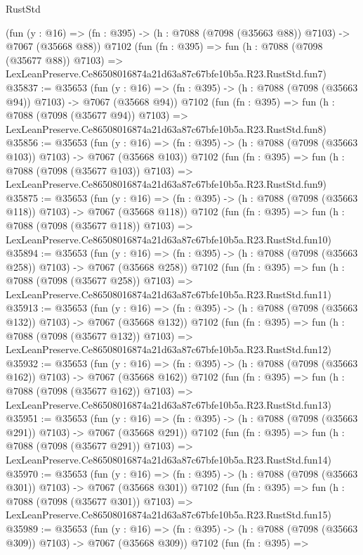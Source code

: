 \begin{lexlean}{RustStd}
\begin{coremodule}
    (fun (y : @16) => (fn : @395) -> (h : @7088 (@7098 (@35663 @88)) @7103) -> @7067 (@35668 @88))
    @7102
    (fun (fn : @395) =>
    fun (h : @7088 (@7098 (@35677 @88)) @7103) =>
    LexLeanPreserve.Ce86508016874a21d63a87c67bfe10b5a.R23.RustStd.fun7)
@35837 := @35653
    (fun (y : @16) => (fn : @395) -> (h : @7088 (@7098 (@35663 @94)) @7103) -> @7067 (@35668 @94))
    @7102
    (fun (fn : @395) =>
    fun (h : @7088 (@7098 (@35677 @94)) @7103) =>
    LexLeanPreserve.Ce86508016874a21d63a87c67bfe10b5a.R23.RustStd.fun8)
@35856 := @35653
    (fun (y : @16) => (fn : @395) -> (h : @7088 (@7098 (@35663 @103)) @7103) -> @7067 (@35668 @103))
    @7102
    (fun (fn : @395) =>
    fun (h : @7088 (@7098 (@35677 @103)) @7103) =>
    LexLeanPreserve.Ce86508016874a21d63a87c67bfe10b5a.R23.RustStd.fun9)
@35875 := @35653
    (fun (y : @16) => (fn : @395) -> (h : @7088 (@7098 (@35663 @118)) @7103) -> @7067 (@35668 @118))
    @7102
    (fun (fn : @395) =>
    fun (h : @7088 (@7098 (@35677 @118)) @7103) =>
    LexLeanPreserve.Ce86508016874a21d63a87c67bfe10b5a.R23.RustStd.fun10)
@35894 := @35653
    (fun (y : @16) => (fn : @395) -> (h : @7088 (@7098 (@35663 @258)) @7103) -> @7067 (@35668 @258))
    @7102
    (fun (fn : @395) =>
    fun (h : @7088 (@7098 (@35677 @258)) @7103) =>
    LexLeanPreserve.Ce86508016874a21d63a87c67bfe10b5a.R23.RustStd.fun11)
@35913 := @35653
    (fun (y : @16) => (fn : @395) -> (h : @7088 (@7098 (@35663 @132)) @7103) -> @7067 (@35668 @132))
    @7102
    (fun (fn : @395) =>
    fun (h : @7088 (@7098 (@35677 @132)) @7103) =>
    LexLeanPreserve.Ce86508016874a21d63a87c67bfe10b5a.R23.RustStd.fun12)
@35932 := @35653
    (fun (y : @16) => (fn : @395) -> (h : @7088 (@7098 (@35663 @162)) @7103) -> @7067 (@35668 @162))
    @7102
    (fun (fn : @395) =>
    fun (h : @7088 (@7098 (@35677 @162)) @7103) =>
    LexLeanPreserve.Ce86508016874a21d63a87c67bfe10b5a.R23.RustStd.fun13)
@35951 := @35653
    (fun (y : @16) => (fn : @395) -> (h : @7088 (@7098 (@35663 @291)) @7103) -> @7067 (@35668 @291))
    @7102
    (fun (fn : @395) =>
    fun (h : @7088 (@7098 (@35677 @291)) @7103) =>
    LexLeanPreserve.Ce86508016874a21d63a87c67bfe10b5a.R23.RustStd.fun14)
@35970 := @35653
    (fun (y : @16) => (fn : @395) -> (h : @7088 (@7098 (@35663 @301)) @7103) -> @7067 (@35668 @301))
    @7102
    (fun (fn : @395) =>
    fun (h : @7088 (@7098 (@35677 @301)) @7103) =>
    LexLeanPreserve.Ce86508016874a21d63a87c67bfe10b5a.R23.RustStd.fun15)
@35989 := @35653
    (fun (y : @16) => (fn : @395) -> (h : @7088 (@7098 (@35663 @309)) @7103) -> @7067 (@35668 @309))
    @7102
    (fun (fn : @395) =>

\end{coremodule}
\end{lexlean}
